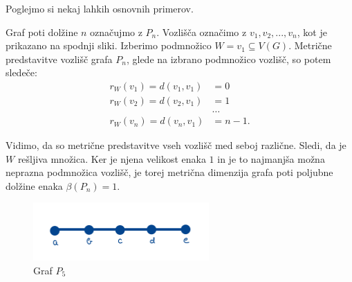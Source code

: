 \documentclass[mat1, tisk]{fmfdelo}
\begin{document}
Poglejmo si nekaj lahkih osnovnih primerov.

\begin{primer} \label{primer_2.4.}
Graf poti dolžine $n$ označujmo z $P_n$. Vozlišča označimo z $v_1, v_2, ..., v_n$, kot 
je prikazano na spodnji sliki. Izberimo podmnožico $W = {v_1} \subseteq V(G).$ 
Metrične predstavitve vozlišč grafa $P_n$, glede na izbrano podmnožico vozlišč, so potem sledeče:
\begin{align*}
    r_W(v_1) = d(v_1, v_1) & = 0 \\
    r_W(v_2) = d(v_2, v_1) & = 1 \\
    & \dots \\
    r_W(v_n) = d(v_n, v_1) & = n-1.
\end{align*}

Vidimo, da so metrične predstavitve vseh vozlišč med seboj različne.
Sledi, da je $W$ rešljiva množica. Ker je njena velikost enaka $1$ in je to najmanjša možna neprazna 
podmnožica vozlišč, je torej metrična dimenzija
grafa poti poljubne dolžine enaka $\beta(P_n) = 1.$

\begin{figure}[h]
    \caption{Graf $P_5$}
    \centering
    \includegraphics[width=0.6\textwidth]{pot.jpg}      
\end{figure}

\end{primer}
\end{document}
